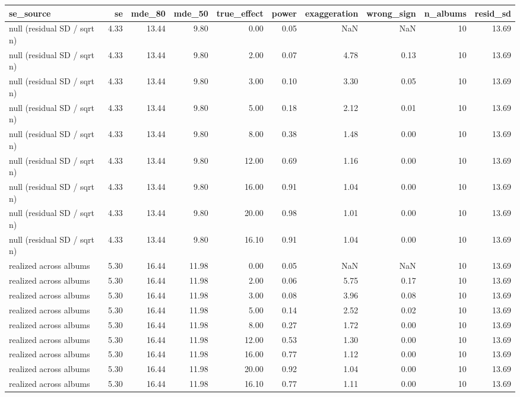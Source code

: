 \begin{tabular}{lrrrrrrrrr}
\toprule
se\_source & se & mde\_80 & mde\_50 & true\_effect & power & exaggeration & wrong\_sign & n\_albums & resid\_sd \\
\midrule
null (residual SD / sqrt n) & 4.33 & 13.44 & 9.80 & 0.00 & 0.05 & NaN & NaN & 10 & 13.69 \\
null (residual SD / sqrt n) & 4.33 & 13.44 & 9.80 & 2.00 & 0.07 & 4.78 & 0.13 & 10 & 13.69 \\
null (residual SD / sqrt n) & 4.33 & 13.44 & 9.80 & 3.00 & 0.10 & 3.30 & 0.05 & 10 & 13.69 \\
null (residual SD / sqrt n) & 4.33 & 13.44 & 9.80 & 5.00 & 0.18 & 2.12 & 0.01 & 10 & 13.69 \\
null (residual SD / sqrt n) & 4.33 & 13.44 & 9.80 & 8.00 & 0.38 & 1.48 & 0.00 & 10 & 13.69 \\
null (residual SD / sqrt n) & 4.33 & 13.44 & 9.80 & 12.00 & 0.69 & 1.16 & 0.00 & 10 & 13.69 \\
null (residual SD / sqrt n) & 4.33 & 13.44 & 9.80 & 16.00 & 0.91 & 1.04 & 0.00 & 10 & 13.69 \\
null (residual SD / sqrt n) & 4.33 & 13.44 & 9.80 & 20.00 & 0.98 & 1.01 & 0.00 & 10 & 13.69 \\
null (residual SD / sqrt n) & 4.33 & 13.44 & 9.80 & 16.10 & 0.91 & 1.04 & 0.00 & 10 & 13.69 \\
realized across albums & 5.30 & 16.44 & 11.98 & 0.00 & 0.05 & NaN & NaN & 10 & 13.69 \\
realized across albums & 5.30 & 16.44 & 11.98 & 2.00 & 0.06 & 5.75 & 0.17 & 10 & 13.69 \\
realized across albums & 5.30 & 16.44 & 11.98 & 3.00 & 0.08 & 3.96 & 0.08 & 10 & 13.69 \\
realized across albums & 5.30 & 16.44 & 11.98 & 5.00 & 0.14 & 2.52 & 0.02 & 10 & 13.69 \\
realized across albums & 5.30 & 16.44 & 11.98 & 8.00 & 0.27 & 1.72 & 0.00 & 10 & 13.69 \\
realized across albums & 5.30 & 16.44 & 11.98 & 12.00 & 0.53 & 1.30 & 0.00 & 10 & 13.69 \\
realized across albums & 5.30 & 16.44 & 11.98 & 16.00 & 0.77 & 1.12 & 0.00 & 10 & 13.69 \\
realized across albums & 5.30 & 16.44 & 11.98 & 20.00 & 0.92 & 1.04 & 0.00 & 10 & 13.69 \\
realized across albums & 5.30 & 16.44 & 11.98 & 16.10 & 0.77 & 1.11 & 0.00 & 10 & 13.69 \\

\end{tabular}
